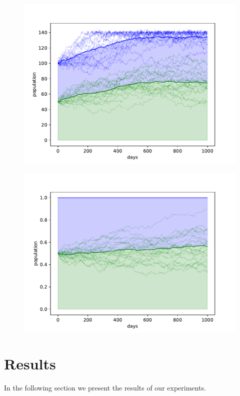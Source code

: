 \documentclass[sigconf]{acmart}
\newcommand{\todo}[1]{{\color{red}{#1}}}
\begin{document}
    \begin{figure}
        \includegraphics[width=\columnwidth]{figures/alt_ego}
        \caption{\todo{}}
        \label{fig:alt_ego}
    \end{figure}


    \begin{figure}
        \includegraphics[width=\columnwidth]{figures/alt_ego_rel}
        \caption{\todo{}}
        \label{fig:alt_ego_rel}
    \end{figure}


    \section{Results}\label{sec:results}
    In the following section we present the results of our experiments.
\end{document}

